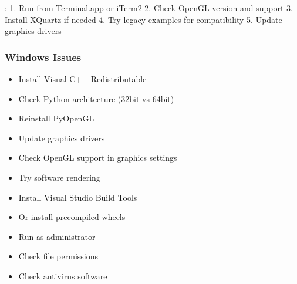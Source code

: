 \documentclass[a4paper,10pt,english,openany,oneside]{sphinxmanual}
\begin{document}
\sphinxAtStartPar
{}:
1. Run from Terminal.app or iTerm2
2. Check OpenGL version and support
3. Install XQuartz if needed
4. Try legacy examples for compatibility
5. Update graphics drivers


\subsubsection{Windows Issues}
\label{\detokenize{troubleshooting:windows-issues}}\begin{description}
\begin{itemize}
\item {} 
\sphinxAtStartPar
Install Visual C++ Redistributable

\item {} 
\sphinxAtStartPar
Check Python architecture (32\sphinxhyphen{}bit vs 64\sphinxhyphen{}bit)

\item {} 
\sphinxAtStartPar
Reinstall PyOpenGL

\end{itemize}

\begin{itemize}
\item {} 
\sphinxAtStartPar
Update graphics drivers

\item {} 
\sphinxAtStartPar
Check OpenGL support in graphics settings

\item {} 
\sphinxAtStartPar
Try software rendering

\end{itemize}

\begin{itemize}
\item {} 
\sphinxAtStartPar
Install Visual Studio Build Tools

\item {} 
\sphinxAtStartPar
Or install pre\sphinxhyphen{}compiled wheels

\end{itemize}

\begin{itemize}
\item {} 
\sphinxAtStartPar
Run as administrator

\item {} 
\sphinxAtStartPar
Check file permissions

\item {} 
\sphinxAtStartPar
Check antivirus software

\end{itemize}

\end{description}
\end{document}
